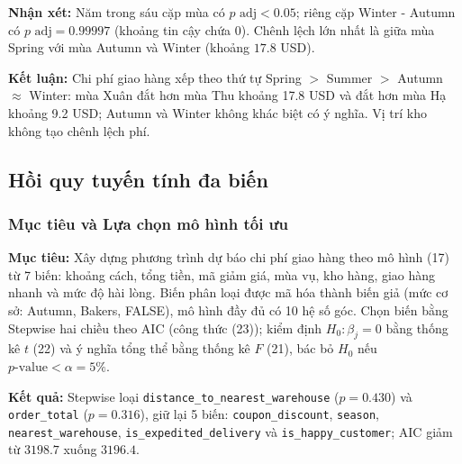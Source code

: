 \textbf{Nhận xét:} Năm trong sáu cặp mùa có $p\text{ adj} < 0.05$; riêng cặp Winter - Autumn có $p\text{ adj} = 0.99997$ (khoảng tin cậy chứa $0$). Chênh lệch lớn nhất là giữa mùa Spring với mùa Autumn và Winter (khoảng $17.8$ USD).

\textbf{Kết luận:} Chi phí giao hàng xếp theo thứ tự Spring $>$ Summer $>$ Autumn $\approx$ Winter: mùa Xuân đắt hơn mùa Thu khoảng 17.8 USD và đắt hơn mùa Hạ khoảng 9.2 USD; Autumn và Winter không khác biệt có ý nghĩa. Vị trí kho không tạo chênh lệch phí.

\subsection{Hồi quy tuyến tính đa biến}\label{sec:hoiquy}

\subsubsection{Mục tiêu và Lựa chọn mô hình tối ưu}
\textbf{Mục tiêu:} Xây dựng phương trình dự báo chi phí giao hàng theo mô hình (17) từ 7 biến: khoảng cách, tổng tiền, mã giảm giá, mùa vụ, kho hàng, giao hàng nhanh và mức độ hài lòng. Biến phân loại được mã hóa thành biến giả (mức cơ sở: Autumn, Bakers, FALSE), mô hình đầy đủ có 10 hệ số góc. Chọn biến bằng Stepwise hai chiều theo AIC (công thức (23)); kiểm định $H_0: \beta_j = 0$ bằng thống kê $t$ (22) và ý nghĩa tổng thể bằng thống kê $F$ (21), bác bỏ $H_0$ nếu $p\text{-value} < \alpha = 5\%$.

\textbf{Kết quả:} Stepwise loại \texttt{distance\_to\_nearest\_warehouse} ($p = 0.430$) và \texttt{order\_total} ($p = 0.316$), giữ lại 5 biến: \texttt{coupon\_discount}, \texttt{season}, \texttt{nearest\_warehouse}, \texttt{is\_expedited\_delivery} và \texttt{is\_happy\_customer}; AIC giảm từ $3198.7$ xuống $3196.4$.

